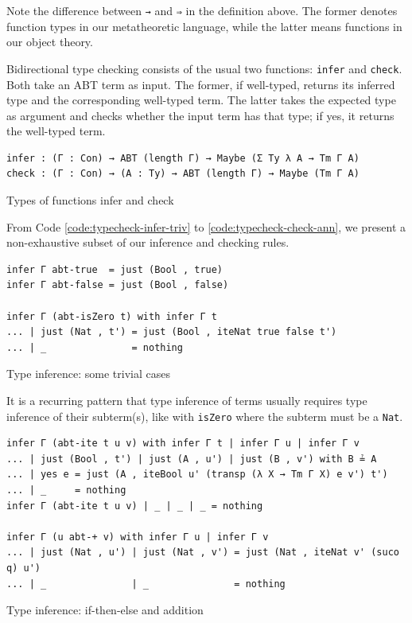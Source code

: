 Note the difference between \verb$→$ and \verb$⇒$ in the definition above. The former denotes function types in our metatheoretic language, while the latter means functions in our object theory.

Bidirectional type checking consists of the usual \cite{dunfield2021bidirectional} two functions: \verb$infer$ and \verb$check$. Both take an ABT term as input. The former, if well-typed, returns its inferred type and the corresponding well-typed term. The latter takes the expected type as argument and checks whether the input term has that type; if yes, it returns the well-typed term.

\begin{listing}[H]
\begin{verbatim}
infer : (Γ : Con) → ABT (length Γ) → Maybe (Σ Ty λ A → Tm Γ A)
check : (Γ : Con) → (A : Ty) → ABT (length Γ) → Maybe (Tm Γ A)
\end{verbatim}
\caption{Types of functions infer and check}
\label{code:typecheck-signatures}
\end{listing}

From Code \ref{code:typecheck-infer-triv} to \ref{code:typecheck-check-ann}, we present a non-exhaustive subset of our inference and checking rules.

\begin{listing}[H]
\begin{verbatim}
infer Γ abt-true  = just (Bool , true)
infer Γ abt-false = just (Bool , false)

infer Γ (abt-isZero t) with infer Γ t
... | just (Nat , t') = just (Bool , iteNat true false t')
... | _               = nothing
\end{verbatim}
\caption{Type inference: some trivial cases}
\label{code:typecheck-infer-triv}
\end{listing}

It is a recurring pattern that type inference of terms usually requires type inference of their subterm(s), like with \verb$isZero$ where the subterm must be a \verb$Nat$.

\begin{listing}[H]
\begin{verbatim}
infer Γ (abt-ite t u v) with infer Γ t | infer Γ u | infer Γ v
... | just (Bool , t') | just (A , u') | just (B , v') with B ≟ A
... | yes e = just (A , iteBool u' (transp (λ X → Tm Γ X) e v') t')
... | _     = nothing
infer Γ (abt-ite t u v) | _ | _ | _ = nothing

infer Γ (u abt-+ v) with infer Γ u | infer Γ v
... | just (Nat , u') | just (Nat , v') = just (Nat , iteNat v' (suco q) u')
... | _               | _               = nothing
\end{verbatim}
\caption{Type inference: if-then-else and addition}
\label{code:typecheck-infer-ite}
\end{listing}

